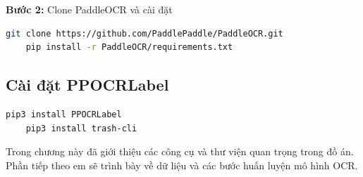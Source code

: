 \textbf{Bước 2:} Clone PaddleOCR và cài đặt
\begin{lstlisting}[language=bash]
    git clone https://github.com/PaddlePaddle/PaddleOCR.git
    pip install -r PaddleOCR/requirements.txt
\end{lstlisting}

\subsection{Cài đặt PPOCRLabel}
\begin{lstlisting}[language=bash]
    pip3 install PPOCRLabel
    pip3 install trash-cli
\end{lstlisting}

Trong chương này đã giới thiệu các công cụ và thư viện quan trọng trong đồ án. Phần tiếp theo em sẽ trình bày về dữ liệu và các bước huấn luyện mô hình OCR.